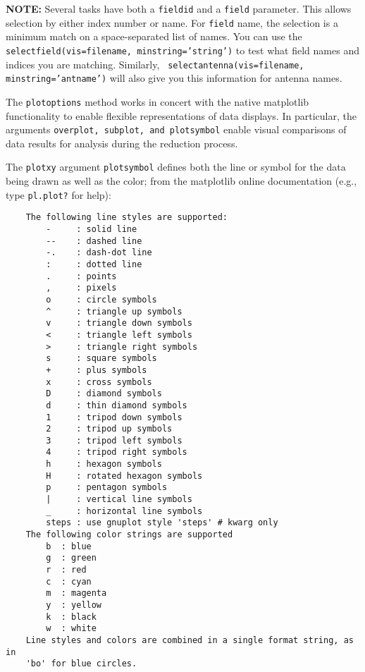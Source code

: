 {\bf NOTE:} Several tasks have both a {\tt fieldid} and a {\tt field}
parameter. This allows selection by either index number or name. For
{\tt field} name, the selection is a minimum match on a
space-separated list of names. You can use the {\tt
selectfield(vis=filename, minstring='string')} to test what field
names and indices you are matching. Similarly, {\tt
selectantenna(vis=filename, minstring='antname')} will also give you
this information for antenna names.

\vspace{3mm}

The {\tt plotoptions} method works in concert with the native matplotlib
functionality to enable flexible representations of data displays. In
particular, the arguments {\tt overplot, subplot, and plotsymbol} enable
visual comparisons of data results for analysis during the reduction
process.

The {\tt plotxy} argument {\tt plotsymbol} defines both the line or
symbol for the data being drawn as well as the color; from the
matplotlib online documentation (e.g., type {\tt pl.plot?} for help):

\small
\begin{verbatim}
    The following line styles are supported:
        -     : solid line
        --    : dashed line
        -.    : dash-dot line
        :     : dotted line
        .     : points
        ,     : pixels
        o     : circle symbols
        ^     : triangle up symbols
        v     : triangle down symbols
        <     : triangle left symbols
        >     : triangle right symbols
        s     : square symbols
        +     : plus symbols
        x     : cross symbols
        D     : diamond symbols
        d     : thin diamond symbols
        1     : tripod down symbols
        2     : tripod up symbols
        3     : tripod left symbols
        4     : tripod right symbols
        h     : hexagon symbols
        H     : rotated hexagon symbols
        p     : pentagon symbols
        |     : vertical line symbols
        _     : horizontal line symbols
        steps : use gnuplot style 'steps' # kwarg only
    The following color strings are supported
        b  : blue
        g  : green
        r  : red
        c  : cyan
        m  : magenta
        y  : yellow
        k  : black
        w  : white
    Line styles and colors are combined in a single format string, as in
    'bo' for blue circles.
\end{verbatim}
\normalsize


